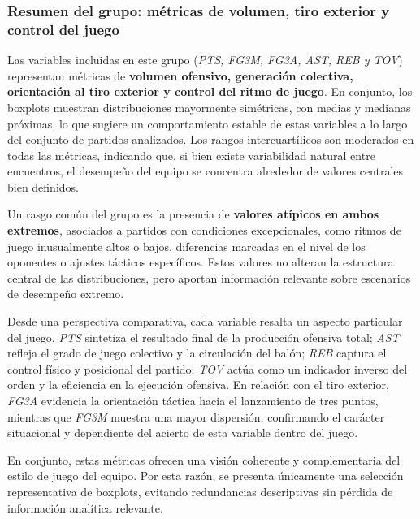 \documentclass[12pt]{article}
\begin{document}
\subsubsection*{Resumen del grupo: métricas de volumen, tiro exterior y control del juego}

Las variables incluidas en este grupo (\textit{PTS, FG3M, FG3A, AST, REB y TOV}) representan métricas
de \textbf{volumen ofensivo, generación colectiva, orientación al tiro exterior y control del ritmo
de juego}. En conjunto, los boxplots muestran distribuciones mayormente simétricas, con medias y
medianas próximas, lo que sugiere un comportamiento estable de estas variables a lo largo del
conjunto de partidos analizados. Los rangos intercuartílicos son moderados en todas las métricas,
indicando que, si bien existe variabilidad natural entre encuentros, el desempeño del equipo se
concentra alrededor de valores centrales bien definidos.

Un rasgo común del grupo es la presencia de \textbf{valores atípicos en ambos extremos}, asociados a
partidos con condiciones excepcionales, como ritmos de juego inusualmente altos o bajos,
diferencias marcadas en el nivel de los oponentes o ajustes tácticos específicos. Estos valores no
alteran la estructura central de las distribuciones, pero aportan información relevante sobre
escenarios de desempeño extremo.

Desde una perspectiva comparativa, cada variable resalta un aspecto particular del juego.
\textit{PTS} sintetiza el resultado final de la producción ofensiva total; \textit{AST} refleja el
grado de juego colectivo y la circulación del balón; \textit{REB} captura el control físico y
posicional del partido; \textit{TOV} actúa como un indicador inverso del orden y la eficiencia en la
ejecución ofensiva. En relación con el tiro exterior, \textit{FG3A} evidencia la orientación táctica
hacia el lanzamiento de tres puntos, mientras que \textit{FG3M} muestra una mayor dispersión,
confirmando el carácter situacional y dependiente del acierto de esta variable dentro del juego.

En conjunto, estas métricas ofrecen una visión coherente y complementaria del estilo de juego del
equipo. Por esta razón, se presenta únicamente una selección representativa de boxplots, evitando
redundancias descriptivas sin pérdida de información analítica relevante.
\end{document}
